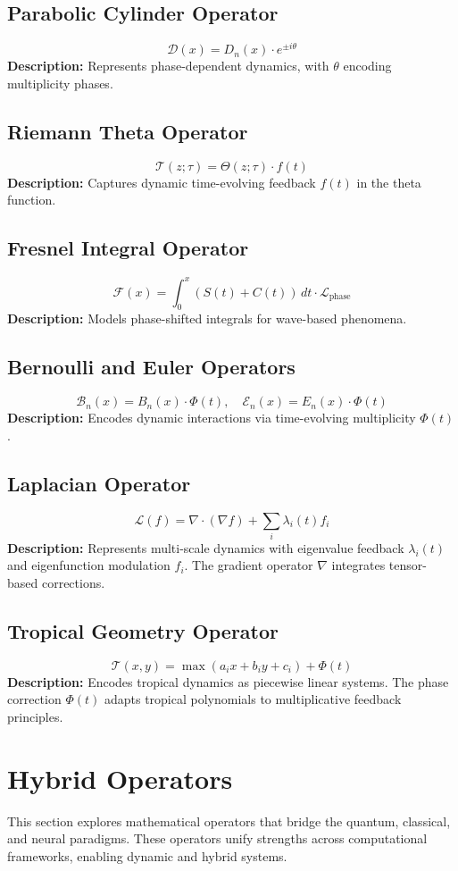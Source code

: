 \documentclass{article}
\theoremstyle{plain}
\begin{document}
\subsection{Parabolic Cylinder Operator}
\[
\mathcal{D}(x) = D_n(x) \cdot e^{\pm i\theta}
\]
\textbf{Description:} Represents phase-dependent dynamics, with $\theta$ encoding multiplicity phases.

\subsection{Riemann Theta Operator}
\[
\mathcal{T}(z; \tau) = \Theta(z; \tau) \cdot f(t)
\]
\textbf{Description:} Captures dynamic time-evolving feedback $f(t)$ in the theta function.

\subsection{Fresnel Integral Operator}
\[
\mathcal{F}(x) = \int_0^x \left( S(t) + C(t) \right) \, dt \cdot \mathcal{L}_{\text{phase}}
\]
\textbf{Description:} Models phase-shifted integrals for wave-based phenomena.

\subsection{Bernoulli and Euler Operators}
\[
\mathcal{B}_n(x) = B_n(x) \cdot \Phi(t), \quad \mathcal{E}_n(x) = E_n(x) \cdot \Phi(t)
\]
\textbf{Description:} Encodes dynamic interactions via time-evolving multiplicity $\Phi(t)$.
\subsection{Laplacian Operator}
\[
\mathcal{L}(f) = \nabla \cdot (\nabla f) + \sum_{i} \lambda_i(t) f_i
\]
\textbf{Description:} Represents multi-scale dynamics with eigenvalue feedback $\lambda_i(t)$ and eigenfunction modulation $f_i$. The gradient operator $\nabla$ integrates tensor-based corrections.

\subsection{Tropical Geometry Operator}
\[
\mathcal{T}(x, y) = \max(a_i x + b_i y + c_i) + \Phi(t)
\]
\textbf{Description:} Encodes tropical dynamics as piecewise linear systems. The phase correction $\Phi(t)$ adapts tropical polynomials to multiplicative feedback principles.

\section{Hybrid Operators}
This section explores mathematical operators that bridge the quantum, classical, and neural paradigms. These operators unify strengths across computational frameworks, enabling dynamic and hybrid systems.
\end{document}

